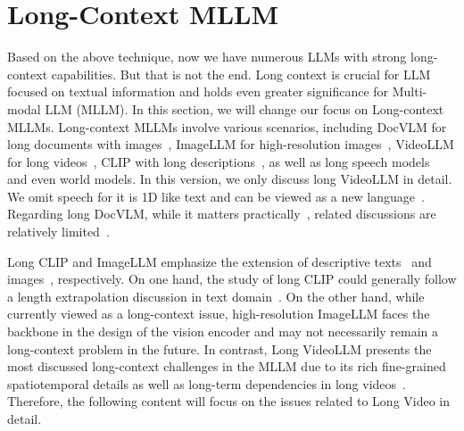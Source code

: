 \section{Long-Context MLLM}\label{sec10}


Based on the above technique, now we have numerous LLMs with strong long-context capabilities. But that is not the end. Long context is crucial for LLM focused on textual information and holds even greater significance for Multi-modal LLM (MLLM). In this section, we will change our focus on Long-context MLLMs. Long-context MLLMs involve various scenarios, including DocVLM for long documents with images~\citep{xie2024wukong,hu2024mplug}, ImageLLM for high-resolution images~\citep{li2024monkey,lin2023sphinx}, VideoLLM for long videos~\citep{zhang2406long,wang2024qwen2}, CLIP with long descriptions~\citep{zhang2025long,wulotlip}, as well as long speech models~\citep{reid2024gemini} and even world models\citep{liu2024world,zhan2024anygpt}. In this version, we only discuss long VideoLLM in detail. We omit speech for it is 1D like text and can be viewed as a new language~\citep{zhang2023speechgpt,zhang2024speechgpt}. Regarding long DocVLM, while it matters practically~\citep{jaisankar2024postdoc,zhang2024mgte,ma2024mmlongbench,chia2024m}, related discussions are relatively limited~\citep{xie2024wukong,hu2024mplug,blau2024gram,liu2024focus}.

Long CLIP and ImageLLM emphasize the extension of descriptive texts~\citep{zheng2025dreamlip,zhang2025long,wang2024videoclip} and images~\citep{li2024monkey,lin2023sphinx}, respectively. On one hand, the study of long CLIP could generally follow a length extrapolation discussion in text domain~\citep{zhang2025long,najdenkoska2024tulip}. On the other hand, while currently viewed as a long-context issue, high-resolution ImageLLM faces the backbone in the design of the vision encoder and may not necessarily remain a long-context problem in the future. In contrast, Long VideoLLM presents the most discussed long-context challenges in the MLLM due to its rich fine-grained spatiotemporal details as well as long-term dependencies in long videos~\citep{zou2024seconds,li2024giraffe}. Therefore, the following content will focus on the issues related to Long Video in detail.

